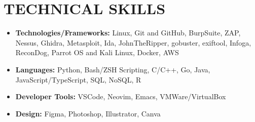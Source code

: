 \documentclass[letterpaper,11pt]{article}
\makeatletter
\newcommand{\uniformunderline}[1]{%
  \uline{\phantom{#1}}%
  \llap{\contour{white}{#1}}%
}
\newcommand{\resumeItem}[1]{
  \item\small{
    {#1 \vspace{-2pt}}
  }
}
\newcommand{\resumeSubheading}[4]{
  \vspace{-2pt}\item
    \begin{tabular*}{1.0\textwidth}[t]{l@{\extracolsep{\fill}}r}
      \textbf{\large#1} & \textbf{\small #2} \\
      \textit{\large#3} & \textit{\small #4} \\
      
    \end{tabular*}\vspace{-7pt}
}
\newcommand{\resumeSubHeadingListStart}{\begin{itemize}[leftmargin=0.0in, label={}]}
\newcommand{\resumeSubHeadingListEnd}{\end{itemize}}
\newcommand{\resumeItemListStart}{\begin{itemize}}
\newcommand{\resumeItemListEnd}{\end{itemize}\vspace{-5pt}}
\makeatother
\begin{document}
\section{TECHNICAL SKILLS}
 \begin{itemize}[leftmargin=0in, label={}]
    \small{\item{
    \resumeItemListStart
     \resumeItem{\textbf{\normalsize{Technologies/Frameworks:}}{ \normalsize{Linux, Git and GitHub, BurpSuite, ZAP, Nessus, Ghidra, Metasploit, Ida, JohnTheRipper, gobuster, exiftool, Infoga, ReconDog, Parrot OS and Kali Linux, Docker}, AWS}} \\
     \resumeItem{\textbf{\normalsize{Languages:}}{ \normalsize{Python, Bash/ZSH Scripting, C/C++, Go, Java, JavaScript/TypeScript, SQL, NoSQL, R}}} \\
     \resumeItem{\textbf{\normalsize{Developer Tools:}}{ \normalsize{VSCode, Neovim, Emacs, VMWare/VirtualBox}}} \\
     \resumeItem{\textbf{\normalsize{Design:}}{ \normalsize{Figma, Photoshop, Illustrator, Canva}}}
     \resumeItemListEnd
    }}
 \end{itemize}
 \vspace{-10pt}



% 
%   
\end{document}
